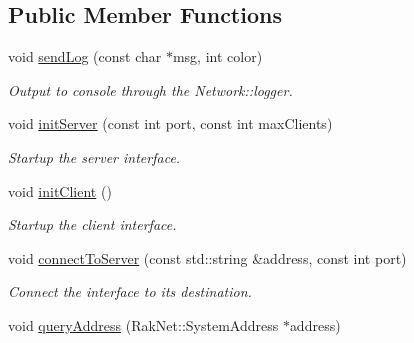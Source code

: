 \subsection*{Public Member Functions}
\begin{DoxyCompactItemize}
\item 
\hypertarget{class_champ_net_1_1_network_a3d25e6581e6a53201de1f68ed266724e}{void \hyperlink{class_champ_net_1_1_network_a3d25e6581e6a53201de1f68ed266724e}{send\-Log} (const char $\ast$msg, int color)}\label{class_champ_net_1_1_network_a3d25e6581e6a53201de1f68ed266724e}

\begin{DoxyCompactList}\small\item\em Output to console through the Network\-::logger. \end{DoxyCompactList}\item 
\hypertarget{class_champ_net_1_1_network_ac0d53751c94ef1df4cee9ce3719432bf}{void \hyperlink{class_champ_net_1_1_network_ac0d53751c94ef1df4cee9ce3719432bf}{init\-Server} (const int port, const int max\-Clients)}\label{class_champ_net_1_1_network_ac0d53751c94ef1df4cee9ce3719432bf}

\begin{DoxyCompactList}\small\item\em Startup the server interface. \end{DoxyCompactList}\item 
\hypertarget{class_champ_net_1_1_network_af7bda654a247a00e46d6adcc87c8d65b}{void \hyperlink{class_champ_net_1_1_network_af7bda654a247a00e46d6adcc87c8d65b}{init\-Client} ()}\label{class_champ_net_1_1_network_af7bda654a247a00e46d6adcc87c8d65b}

\begin{DoxyCompactList}\small\item\em Startup the client interface. \end{DoxyCompactList}\item 
\hypertarget{class_champ_net_1_1_network_a9dbfd1e6e9e5f11720a6e8e41174df1e}{void \hyperlink{class_champ_net_1_1_network_a9dbfd1e6e9e5f11720a6e8e41174df1e}{connect\-To\-Server} (const std\-::string \&address, const int port)}\label{class_champ_net_1_1_network_a9dbfd1e6e9e5f11720a6e8e41174df1e}

\begin{DoxyCompactList}\small\item\em Connect the interface to its destination. \end{DoxyCompactList}\item 
\hypertarget{class_champ_net_1_1_network_a9cde161aafa694e5fef8d1c3fac3edd3}{void \hyperlink{class_champ_net_1_1_network_a9cde161aafa694e5fef8d1c3fac3edd3}{query\-Address} (Rak\-Net\-::\-System\-Address $\ast$address)}\label{class_champ_net_1_1_network_a9cde161aafa694e5fef8d1c3fac3edd3}


\end{DoxyCompactItemize}
